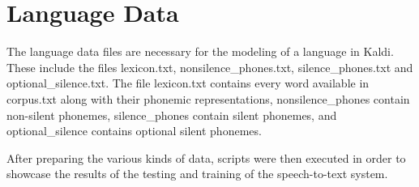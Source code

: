 \section{Language Data}

The language data files are necessary for the modeling of a language in Kaldi. These include the files lexicon.txt, nonsilence\_phones.txt, silence\_phones.txt and optional\_silence.txt. The file lexicon.txt contains every word available in corpus.txt along with their phonemic representations, nonsilence\_phones contain non-silent phonemes, silence\_phones contain silent phonemes, and optional\_silence contains optional silent phonemes.

After preparing the various kinds of data, scripts were then executed in order to showcase the results of the testing and training of the speech-to-text system.



